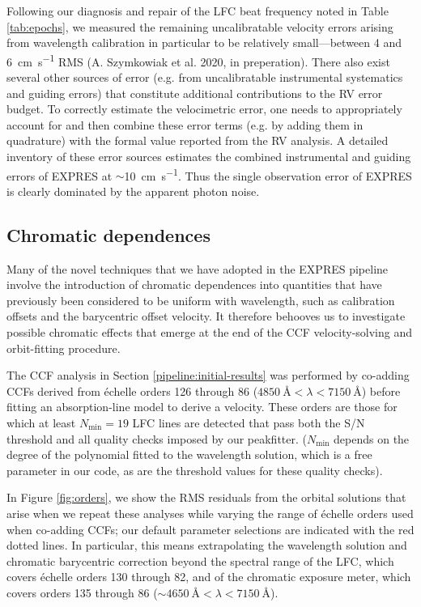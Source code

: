 Following our diagnosis and repair of the LFC beat frequency noted in Table \ref{tab:epochs}, we measured the remaining uncalibratable velocity errors arising from wavelength calibration in particular to be relatively small---between 4 and 6~\si{\centi\meter\per\second}{} RMS (A. Szymkowiak et al. 2020, in preperation). There also exist several other sources of error (e.g. from uncalibratable instrumental systematics and guiding errors) that constitute additional contributions to the RV error budget. To correctly estimate the velocimetric error, one needs to appropriately account for and then combine these error terms (e.g. by adding them in quadrature) with the formal value reported from the RV analysis. A detailed inventory of these error sources \citep{blackman_performance_2020} estimates the combined instrumental and guiding errors of EXPRES at $\sim$10~\si{\centi\meter\per\second}. Thus the single observation error of EXPRES is clearly dominated by the apparent photon noise.

\subsection{Chromatic dependences}
\label{pipeline:ccf-order-selection}

Many of the novel techniques that we have adopted in the EXPRES pipeline involve the introduction of chromatic dependences into quantities that have previously been considered to be uniform with wavelength, such as calibration offsets and the barycentric offset velocity. It therefore behooves us to investigate possible chromatic effects that emerge at the end of the CCF velocity-solving and orbit-fitting procedure.

The CCF analysis in Section \ref{pipeline:initial-results} was performed by co-adding CCFs derived from \'echelle orders 126 through 86 ($4850~\si{\angstrom}<\lambda<7150~\si{\angstrom}$) before fitting an absorption-line model to derive a velocity. These orders are those for which at least $N_\mathrm{min}=19$ LFC lines are detected that pass both the S/N threshold and all quality checks imposed by our peakfitter. ($N_\mathrm{min}$ depends on the degree of the polynomial fitted to the wavelength solution, which is a free parameter in our code, as are the threshold values for these quality checks).

In Figure \ref{fig:orders}, we show the RMS residuals from the orbital solutions that arise when we repeat these analyses while varying the range of \'echelle orders used when co-adding CCFs; our default parameter selections are indicated with the red dotted lines. In particular, this means extrapolating the wavelength solution and chromatic barycentric correction beyond the spectral range of the LFC, which covers \'echelle orders 130 through 82, and of the chromatic exposure meter, which covers orders 135 through 86 ($\sim4650~\si{\angstrom}<\lambda<7150~\si{\angstrom}$).

